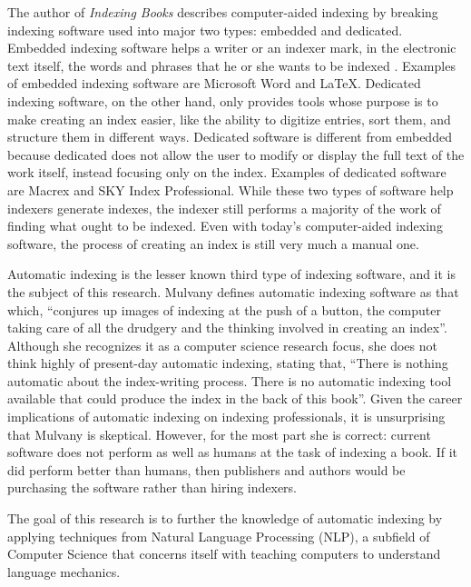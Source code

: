 The author of {\it Indexing Books} describes computer-aided indexing by breaking indexing software used into major two types: embedded and dedicated.
Embedded indexing software helps a writer or an indexer mark, in the electronic text itself, the words and phrases that he or she wants to be indexed \cite{mulvany}.
Examples of embedded indexing software are Microsoft Word \cite{ms-word-indexing} and \LaTeX \cite{lamport}.
Dedicated indexing software, on the other hand, only provides tools whose purpose is to make creating an index easier, like the ability to digitize entries, sort them, and structure them in different ways\cite{mulvany}.
Dedicated software is different from embedded because dedicated does not allow the user to modify or display the full text of the work itself, instead focusing only on the index.
Examples of dedicated software are Macrex\cite{macrex} and SKY Index Professional\cite{sky-software}.
While these two types of software help indexers generate indexes, the indexer still performs a majority of the work of finding what ought to be indexed.
Even with today's computer-aided indexing software, the process of creating an index is still very much a manual one.

Automatic indexing is the lesser known third type of indexing software, and it is the subject of this research.
Mulvany defines automatic indexing software as that which, ``conjures up images of indexing at the push of a button, the computer taking care of all the drudgery and the thinking involved in creating an index''\cite{mulvany}.
Although she recognizes it as a computer science research focus, she does not think highly of present-day automatic indexing, stating that, ``There is nothing automatic about the index-writing process.
There is no automatic indexing tool available that could produce the index in the back of this book''\cite{mulvany}.
Given the career implications of automatic indexing on indexing professionals, it is unsurprising that Mulvany is skeptical.
However, for the most part she is correct: current software does not perform as well as humans at the task of indexing a book.
If it did perform better than humans, then publishers and authors would be purchasing the software rather than hiring indexers.

The goal of this research is to further the knowledge of automatic indexing by applying techniques from Natural Language Processing (NLP), a subfield of Computer Science that concerns itself with teaching computers to understand language mechanics.
